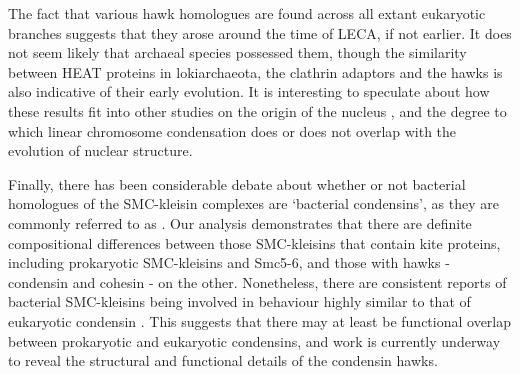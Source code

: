 \documentclass[a4paper,11pt,twoside,openright]{scrbook}
\begin{document}
The fact that various hawk homologues are found across all extant eukaryotic branches suggests that they arose around the time of LECA, if not earlier. It does not seem likely that archaeal species possessed them, though the similarity between HEAT proteins in lokiarchaeota, the clathrin adaptors and the hawks is also indicative of their early evolution. It is interesting to speculate about how these results fit into other studies on the origin of the nucleus \cite{Devos2014,Baum2014}, and the degree to which linear chromosome condensation does or does not overlap with the evolution of nuclear structure.

Finally, there has been considerable debate about whether or not bacterial homologues of the SMC-kleisin complexes are `bacterial condensins', as they are commonly referred to as \cite{Case2004,Hirano2016,Niki2016}. Our analysis demonstrates that there are definite compositional differences between those SMC-kleisins that contain kite proteins, including prokaryotic SMC-kleisins and Smc5-6, and those with hawks - condensin and cohesin - on the other. Nonetheless, there are consistent reports of bacterial SMC-kleisins being involved in behaviour highly similar to that of eukaryotic condensin \cite{Case2004,Wang2017}. This suggests that there may at least be functional overlap between prokaryotic and eukaryotic condensins, and work is currently underway to reveal the structural and functional details of the condensin hawks.


\end{document}
